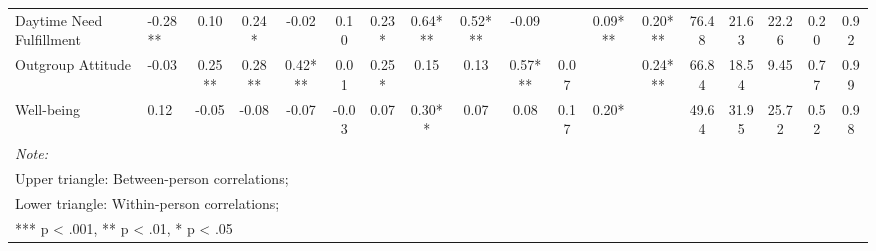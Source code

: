 \begin{sidewaystable}
{\begin{tabular}[t]{llcccccccccccccccc}
Daytime Need Fulfillment & -0.28** & 0.10 & 0.24* & -0.02 & 0.10 & 0.23* & 0.64*** & 0.52*** & -0.09 &  & 0.09*** & 0.20*** & 76.48 & 21.63 & 22.26 & 0.20 & 0.92\\
\addlinespace
Outgroup Attitude & -0.03 & 0.25** & 0.28** & 0.42*** & 0.01 & 0.25* & 0.15 & 0.13 & 0.57*** & 0.07 &  & 0.24*** & 66.84 & 18.54 & 9.45 & 0.77 & 0.99\\
Well-being & 0.12 & -0.05 & -0.08 & -0.07 & -0.03 & 0.07 & 0.30** & 0.07 & 0.08 & 0.17 & 0.20* &  & 49.64 & 31.95 & 25.72 & 0.52 & 0.98\\
\bottomrule
\multicolumn{18}{l}{\rule{0pt}{1em}\textit{Note: }}\\
\multicolumn{18}{l}{\rule{0pt}{1em}Upper triangle: Between-person correlations;}\\
\multicolumn{18}{l}{\rule{0pt}{1em}Lower triangle: Within-person correlations;}\\
\multicolumn{18}{l}{\rule{0pt}{1em}*** p < .001, ** p < .01,  * p < .05}\\
\end{tabular}}
\end{sidewaystable}
